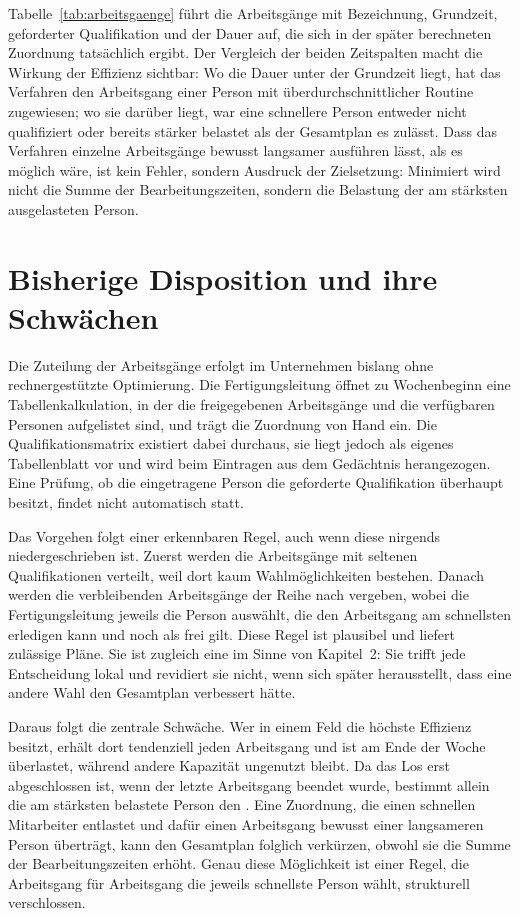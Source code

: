 

Tabelle~\ref{tab:arbeitsgaenge} führt die \ZahlAufgaben{} Arbeitsgänge mit
Bezeichnung, Grundzeit, geforderter Qualifikation und der Dauer auf, die sich
in der später berechneten Zuordnung tatsächlich ergibt. Der Vergleich der
beiden Zeitspalten macht die Wirkung der Effizienz sichtbar: Wo die Dauer unter
der Grundzeit liegt, hat das Verfahren den Arbeitsgang einer Person mit
überdurchschnittlicher Routine zugewiesen; wo sie darüber liegt, war eine
schnellere Person entweder nicht qualifiziert oder bereits stärker belastet als
der Gesamtplan es zulässt. Dass das Verfahren einzelne Arbeitsgänge bewusst
langsamer ausführen lässt, als es möglich wäre, ist kein Fehler, sondern
Ausdruck der Zielsetzung: Minimiert wird nicht die Summe der Bearbeitungszeiten,
sondern die Belastung der am stärksten ausgelasteten Person.

\section{Bisherige Disposition und ihre Schwächen}
\label{sec:disposition}

Die Zuteilung der Arbeitsgänge erfolgt im Unternehmen bislang ohne
rechnergestützte Optimierung. Die Fertigungsleitung öffnet zu Wochenbeginn eine
Tabellenkalkulation, in der die freigegebenen Arbeitsgänge und die verfügbaren
Personen aufgelistet sind, und trägt die Zuordnung von Hand ein. Die
Qualifikationsmatrix existiert dabei durchaus, sie liegt jedoch als eigenes
Tabellenblatt vor und wird beim Eintragen aus dem Gedächtnis herangezogen. Eine
Prüfung, ob die eingetragene Person die geforderte Qualifikation überhaupt
besitzt, findet nicht automatisch statt.

Das Vorgehen folgt einer erkennbaren Regel, auch wenn diese nirgends
niedergeschrieben ist. Zuerst werden die Arbeitsgänge mit seltenen
Qualifikationen verteilt, weil dort kaum Wahlmöglichkeiten bestehen. Danach
werden die verbleibenden Arbeitsgänge der Reihe nach vergeben, wobei die
Fertigungsleitung jeweils die Person auswählt, die den Arbeitsgang am
schnellsten erledigen kann und noch als frei gilt. Diese Regel ist plausibel
und liefert zulässige Pläne. Sie ist zugleich eine  im Sinne
von Kapitel~2: Sie trifft jede Entscheidung lokal und revidiert sie nicht,
wenn sich später herausstellt, dass eine andere Wahl den Gesamtplan verbessert
hätte.

Daraus folgt die zentrale Schwäche. Wer in einem Feld die höchste Effizienz
besitzt, erhält dort tendenziell jeden Arbeitsgang und ist am Ende der Woche
überlastet, während andere Kapazität ungenutzt bleibt. Da das Los erst
abgeschlossen ist, wenn der letzte Arbeitsgang beendet wurde, bestimmt allein
die am stärksten belastete Person den . Eine Zuordnung, die einen
schnellen Mitarbeiter entlastet und dafür einen Arbeitsgang bewusst einer
langsameren Person überträgt, kann den Gesamtplan folglich verkürzen, obwohl
sie die Summe der Bearbeitungszeiten erhöht. Genau diese Möglichkeit ist einer
Regel, die Arbeitsgang für Arbeitsgang die jeweils schnellste Person wählt,
strukturell verschlossen.

